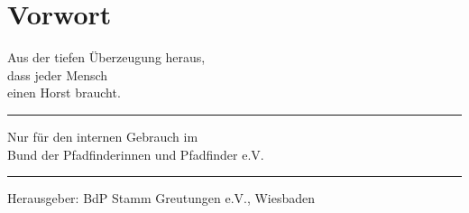 \documentclass[a5paper,
              12pt,
              pagesize,
              typearea,
              titlepage,
              DIV=10,
              twoside
              ]{scrbook}
\begin{document}
  \pagestyle{empty}
  

    
    \cleardoublepage
    
    \chapter*{Vorwort}
      Aus der tiefen Überzeugung heraus,\\
      dass jeder Mensch\\
      einen Horst braucht.\\
      
      \par\noindent\rule{\textwidth}{0.4pt}
      
      Nur für den internen Gebrauch im\\
      Bund der Pfadfinderinnen und Pfadfinder e.V.
      
      \par\noindent\rule{\textwidth}{0.4pt}
      
      Herausgeber: BdP Stamm Greutungen e.V., Wiesbaden
      
      \newpage

    \fancyhf{}
    \pagestyle{fancy}
    
    \renewcommand\listfigurename{Ein schnelles Lied!}
    \listoffigures
    
    \newcommand{\Lied}[1]{
        
    }
    
    
    \Lied{Abends}
    \Lied{Abends treten Elche}
    \Lied{Abschied im Herbstwind}
    \Lied{Abschied von der Meute}
    \Lied{Ach, Glöckelein}
    
    \Lied{Maienbaum}
    
    
    
    
    \pagestyle{empty}
    
    \printindex
    
\end{document}
